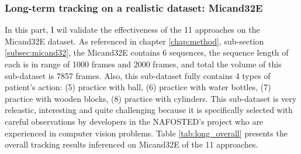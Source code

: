 \subsubsection{Long-term tracking on a realistic dataset: Micand32E}
In this part, I wil validate the effectiveness of the 11 approaches on the Micand32E dataset. As referenced in chapter \ref{chap:method}, sub-section \ref{subsec:micand32}, the Micand32E contains 6 sequences, the sequence length of each is in range of 1000 frames and 2000 frames, and total the volume of this sub-dataset is 7857 frames. Also, this sub-dataset fully contains 4 types of patient’s action: (5) practice with ball, (6) practice with water bottles, (7) practice with wooden blocks, (8) practice with cylinders. This sub-dataset is very releastic, interesting and quite challenging because it is specifically selected with careful observations  by developers in the NAFOSTED’s project who are experienced in computer vision problems.
Table \ref{tab:long_overall} presents the overall tracking results inferenced on Micand32E of the 11 approaches.
